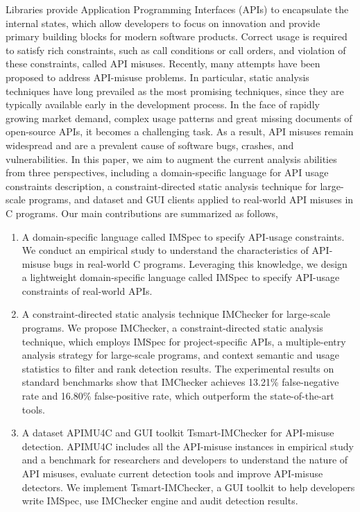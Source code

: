 \begin{eabstract}
   Libraries provide Application Programming Interfaces (APIs) to encapsulate the internal states, 
   which allow developers to focus on innovation and provide primary building blocks for modern software products.
   Correct usage is required to satisfy rich constraints, such as call conditions or call orders, and violation of these constraints, called API misuses.
   Recently, many attempts have been proposed to address API-misuse problems. 
   In particular, static analysis techniques have long prevailed as the most promising techniques, since they are typically available early in the development process.
   In the face of rapidly growing market demand, complex usage patterns and great missing documents of open-source APIs, 
   it becomes a challenging task.
   As a result, API misuses remain widespread and are a prevalent cause of software bugs, crashes, and vulnerabilities.
   In this paper, we aim to augment the current analysis abilities from three perspectives, including a domain-specific language for API usage constraints description, 
   a constraint-directed static analysis technique for large-scale programs,
   and dataset and GUI clients applied to real-world API misuses in C programs.
   Our main contributions are summarized as follows,
   \begin{enumerate}
   	\item A domain-specific language called IMSpec to specify API-usage constraints.
   	We conduct an empirical study to understand the characteristics
   	of API-misuse bugs in real-world C programs.
   	Leveraging this knowledge, we design a lightweight domain-specific language called IMSpec to specify API-usage constraints of real-world APIs.
   	\item A constraint-directed static analysis technique IMChecker for large-scale programs.
   	We propose IMChecker, a constraint-directed static analysis technique, which employs IMSpec for project-specific APIs, a multiple-entry analysis strategy for large-scale programs, and context semantic and usage statistics to filter and rank detection results.
   	The experimental results on standard benchmarks show that IMChecker achieves 13.21\% false-negative rate and 16.80\% false-positive rate, 
   	which outperform the state-of-the-art tools.
   	\item A dataset APIMU4C and GUI toolkit Tsmart-IMChecker for API-misuse detection.
   	APIMU4C includes all the API-misuse instances in empirical study and a benchmark for researchers and developers to understand the nature of API misuses, evaluate current detection tools and improve API-misuse detectors.
   	We implement Tsmart-IMChecker, a GUI toolkit to help developers write IMSpec, use IMChecker engine and audit detection results.
   \end{enumerate}


\end{eabstract}

